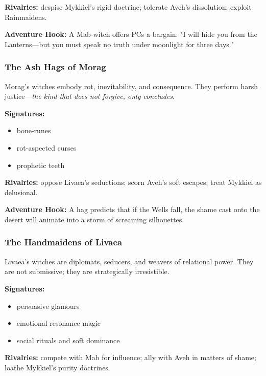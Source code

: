 \documentclass[11pt]{book}
\begin{document}
\textbf{Rivalries:} despise Mykkiel's rigid doctrine; tolerate Aveh's dissolution; exploit Rainmaidens.

\textbf{Adventure Hook:} A Mab-witch offers PCs a bargain: "I will hide you from the Lanterns---but you must speak no truth under moonlight for three days."

\subsubsection{The Ash Hags of Morag}

Morag's witches embody rot, inevitability, and consequence.  
They perform harsh justice---\emph{the kind that does not forgive, only concludes}.

\textbf{Signatures:}
\begin{itemize}[leftmargin=*]
    \item bone-runes  
    \item rot-aspected curses  
    \item prophetic teeth  
\end{itemize}

\textbf{Rivalries:} oppose Livaea's seductions; scorn Aveh's soft escapes; treat Mykkiel as delusional.

\textbf{Adventure Hook:} A hag predicts that if the Wells fall, the shame cast onto the desert will animate into a storm of screaming silhouettes.

\subsubsection{The Handmaidens of Livaea}

Livaea's witches are diplomats, seducers, and weavers of relational power.  
They are not submissive; they are strategically irresistible.

\textbf{Signatures:}
\begin{itemize}[leftmargin=*]
    \item persuasive glamours  
    \item emotional resonance magic  
    \item social rituals and soft dominance  
\end{itemize}

\textbf{Rivalries:} compete with Mab for influence; ally with Aveh in matters of shame; loathe Mykkiel's purity doctrines.
\end{document}
